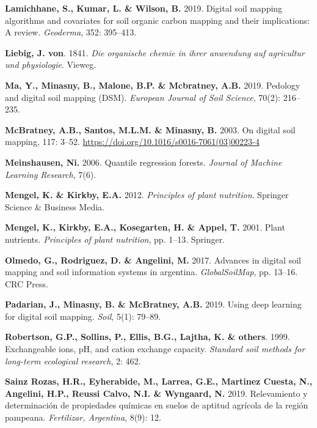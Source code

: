 \documentclass[
  10pt,
  b5paper,
  oneside]{book}
\newlength{\cslhangindent}
\newlength{\cslentryspacingunit} %
\newenvironment{CSLReferences}[2] %
 {%
  \setlength{\parindent}{0pt}
  \ifodd #1
  \let\oldpar\par
  \def\par{\hangindent=\cslhangindent\oldpar}
  \fi
  \setlength{\parskip}{#2\cslentryspacingunit}
 }%
 {}
\begin{document}
\begin{CSLReferences}{0}{0}
\leavevmode{}%
\textbf{Lamichhane, S., Kumar, L. \& Wilson, B.} 2019. Digital soil mapping algorithms and covariates for soil organic carbon mapping and their implications: A review. \emph{Geoderma}, 352: 395--413.

\leavevmode{}%
\textbf{Liebig, J. von}. 1841. \emph{Die organische chemie in ihrer anwendung auf agricultur und physiologie}. Vieweg.

\leavevmode{}%
\textbf{Ma, Y., Minasny, B., Malone, B.P. \& Mcbratney, A.B.} 2019. Pedology and digital soil mapping (DSM). \emph{European Journal of Soil Science}, 70(2): 216--235.

\leavevmode{}%
\textbf{McBratney, A.B., Santos, M.L.M. \& Minasny, B.} 2003. On digital soil mapping, 117: 3--52. \url{https://doi.org/10.1016/s0016-7061(03)00223-4}

\leavevmode{}%
\textbf{Meinshausen, Ni.} 2006. Quantile regression forests. \emph{Journal of Machine Learning Research}, 7(6).

\leavevmode{}%
\textbf{Mengel, K. \& Kirkby, E.A.} 2012. \emph{Principles of plant nutrition}. Springer Science \& Business Media.

\leavevmode{}%
\textbf{Mengel, K., Kirkby, E.A., Kosegarten, H. \& Appel, T.} 2001. Plant nutrients. \emph{Principles of plant nutrition}, pp. 1--13. Springer.

\leavevmode{}%
\textbf{Olmedo, G., Rodriguez, D. \& Angelini, M.} 2017. Advances in digital soil mapping and soil information systems in argentina. \emph{GlobalSoilMap}, pp. 13--16. CRC Press.

\leavevmode{}%
\textbf{Padarian, J., Minasny, B. \& McBratney, A.B.} 2019. Using deep learning for digital soil mapping. \emph{Soil}, 5(1): 79--89.

\leavevmode{}%
\textbf{Robertson, G.P., Sollins, P., Ellis, B.G., Lajtha, K. \& others}. 1999. Exchangeable ions, pH, and cation exchange capacity. \emph{Standard soil methods for long-term ecological research}, 2: 462.

\leavevmode{}%
\textbf{Sainz Rozas, H.R., Eyherabide, M., Larrea, G.E., Martinez Cuesta, N., Angelini, H.P., Reussi Calvo, N.I. \& Wyngaard, N.} 2019. Relevamiento y determinaci{ó}n de propiedades qu{í}micas en suelos de aptitud agr{í}cola de la regi{ó}n pampeana. \emph{Fertilizar, Argentina}, 8(9): 12.


\end{CSLReferences}
\end{document}
